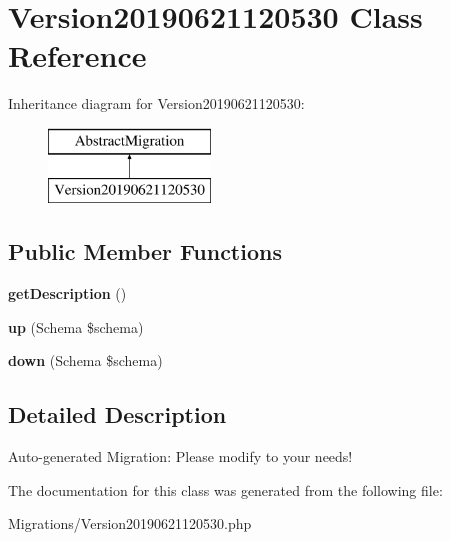 \hypertarget{class_doctrine_migrations_1_1_version20190621120530}{}\section{Version20190621120530 Class Reference}
\label{class_doctrine_migrations_1_1_version20190621120530}
Inheritance diagram for Version20190621120530\+:\begin{figure}[H]
\begin{center}
\leavevmode
\includegraphics[height=2.000000cm]{class_doctrine_migrations_1_1_version20190621120530}
\end{center}
\end{figure}
\subsection*{Public Member Functions}
\begin{DoxyCompactItemize}
\item 
\mbox{\label{class_doctrine_migrations_1_1_version20190621120530_a2e7bb35c71bf1824456ceb944cb7a845}} 
{\bfseries get\+Description} ()
\item 
\mbox{\label{class_doctrine_migrations_1_1_version20190621120530_a23eb1c1428e8ea2ab2cf798fc06ec421}} 
{\bfseries up} (Schema \$schema)
\item 
\mbox{\label{class_doctrine_migrations_1_1_version20190621120530_aa8eb70255a46429d4d6165c778c9e5b9}} 
{\bfseries down} (Schema \$schema)
\end{DoxyCompactItemize}


\subsection{Detailed Description}
Auto-\/generated Migration\+: Please modify to your needs! 

The documentation for this class was generated from the following file\+:\begin{DoxyCompactItemize}
\item 
Migrations/Version20190621120530.\+php\end{DoxyCompactItemize}
